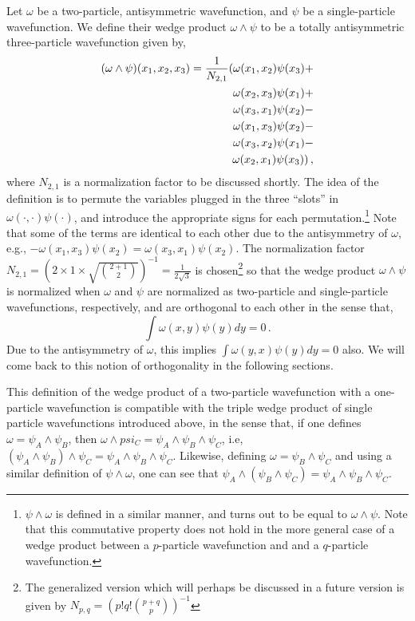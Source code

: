 \documentclass[11pt]{article}
\begin{document}
Let $\omega$ be a two-particle, antisymmetric wavefunction, and $\psi$
be a single-particle wavefunction. We define their wedge product
$\omega \wedge \psi$ to be a totally antisymmetric three-particle
wavefunction given by,
\begin{eqnarray}
  (\omega \wedge \psi)(x_1, x_2, x_3) = \frac{1}{N_{2,1}} (
\omega(x_1,x_2)\psi(x_3)+\cr
\omega(x_2,x_3)\psi(x_1)+\cr
\omega(x_3,x_1)\psi(x_2)-\cr
\omega(x_1,x_3)\psi(x_2)-\cr
\omega(x_3,x_2)\psi(x_1)-\cr
\omega(x_2,x_1)\psi(x_3)) \,,
\end{eqnarray}
where $N_{2,1}$ is a normalization factor to be discussed shortly.
The idea of the definition is to permute the variables plugged in the three
``slots'' in $\omega(\cdot, \cdot)\psi(\cdot)$, and introduce the
appropriate signs for each permutation.\footnote{$\psi\wedge\omega$ is
  defined in a similar manner, and turns out to be equal to
  $\omega\wedge\psi$. Note that this commutative property does not
  hold in the more general case of a wedge product between a
  $p$-particle wavefunction and and a $q$-particle wavefunction.} 
Note that some of the terms
are identical to each other due to the antisymmetry of $\omega$, e.g.,
$-\omega(x_1,x_3)\psi(x_2) = \omega(x_3,x_1)\psi(x_2)$. The
normalization factor $N_{2,1} = (2\times 1\times \sqrt{{2+1\choose 2}})^{-1}
= \frac{1}{2\sqrt{3}}$ is chosen\footnote{The generalized version which will
  perhaps be discussed in a future version is given by
  $N_{p,q}=(p!q!{p+q\choose p})^{-1}$} so that 
the wedge product $\omega\wedge\psi$ is
normalized when $\omega$ and
$\psi$ are normalized as two-particle and single-particle
wavefunctions, respectively, and are orthogonal to each other in the
sense that,
\begin{equation}
  \int \omega(x,y)\psi(y)dy = 0\,.
\end{equation}
Due to the antisymmetry of $\omega$, this implies $\int
\omega(y,x)\psi(y)dy=0$ also. We will come back to this notion of
orthogonality in the following sections.

This definition of the wedge product of a two-particle
wavefunction with a one-particle wavefunction is compatible with the
triple wedge product of single particle wavefunctions introduced above,
in the sense that, if one defines $\omega = \psi_A\wedge\psi_B$, then
$\omega \wedge psi_C = \psi_A\wedge\psi_B\wedge\psi_C$, i.e,
$(\psi_A\wedge\psi_B)\wedge\psi_C =
\psi_A\wedge\psi_B\wedge\psi_C$. Likewise, defining $\omega =
\psi_B\wedge\psi_C$ and using a similar definition of
$\psi\wedge\omega$, one can see that $\psi_A\wedge(\psi_B\wedge\psi_C) =
\psi_A\wedge\psi_B\wedge\psi_C$.
\end{document}
